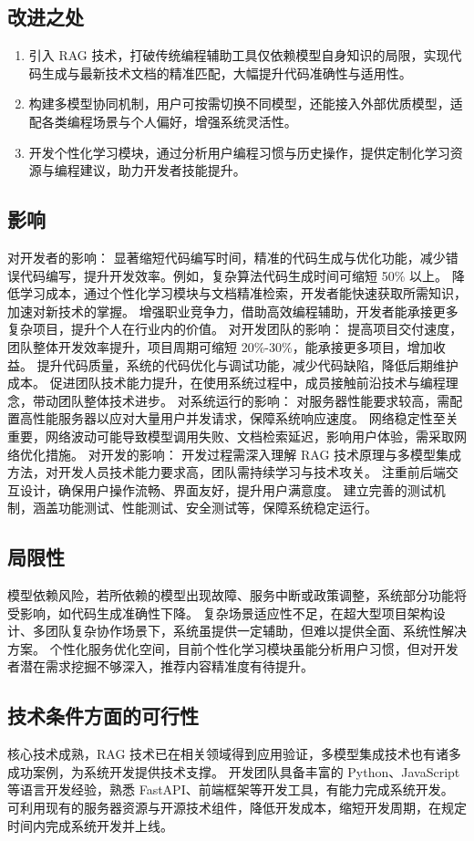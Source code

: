 \documentclass[
    report,     %
    oneside,    %
    UTF8,       %
    zihao=-4    %
]{config} %
\begin{document}
\subsection{改进之处}
\begin{enumerate}[label=(\arabic*)]
    \item 引入 RAG 技术，打破传统编程辅助工具仅依赖模型自身知识的局限，实现代码生成与最新技术文档的精准匹配，大幅提升代码准确性与适用性。
    \item 构建多模型协同机制，用户可按需切换不同模型，还能接入外部优质模型，适配各类编程场景与个人偏好，增强系统灵活性。
    \item 开发个性化学习模块，通过分析用户编程习惯与历史操作，提供定制化学习资源与编程建议，助力开发者技能提升。
\end{enumerate}
\subsection{影响}
对开发者的影响：
显著缩短代码编写时间，精准的代码生成与优化功能，减少错误代码编写，提升开发效率。例如，复杂算法代码生成时间可缩短 50\% 以上。
降低学习成本，通过个性化学习模块与文档精准检索，开发者能快速获取所需知识，加速对新技术的掌握。
增强职业竞争力，借助高效编程辅助，开发者能承接更多复杂项目，提升个人在行业内的价值。
对开发团队的影响：
提高项目交付速度，团队整体开发效率提升，项目周期可缩短 20\%-30\%，能承接更多项目，增加收益。
提升代码质量，系统的代码优化与调试功能，减少代码缺陷，降低后期维护成本。
促进团队技术能力提升，在使用系统过程中，成员接触前沿技术与编程理念，带动团队整体技术进步。
对系统运行的影响：
对服务器性能要求较高，需配置高性能服务器以应对大量用户并发请求，保障系统响应速度。
网络稳定性至关重要，网络波动可能导致模型调用失败、文档检索延迟，影响用户体验，需采取网络优化措施。
对开发的影响：
开发过程需深入理解 RAG 技术原理与多模型集成方法，对开发人员技术能力要求高，团队需持续学习与技术攻关。
注重前后端交互设计，确保用户操作流畅、界面友好，提升用户满意度。
建立完善的测试机制，涵盖功能测试、性能测试、安全测试等，保障系统稳定运行。
\subsection{局限性}
模型依赖风险，若所依赖的模型出现故障、服务中断或政策调整，系统部分功能将受影响，如代码生成准确性下降。
复杂场景适应性不足，在超大型项目架构设计、多团队复杂协作场景下，系统虽提供一定辅助，但难以提供全面、系统性解决方案。
个性化服务优化空间，目前个性化学习模块虽能分析用户习惯，但对开发者潜在需求挖掘不够深入，推荐内容精准度有待提升。
\subsection{技术条件方面的可行性}
核心技术成熟，RAG 技术已在相关领域得到应用验证，多模型集成技术也有诸多成功案例，为系统开发提供技术支撑。
开发团队具备丰富的 Python、JavaScript 等语言开发经验，熟悉 FastAPI、前端框架等开发工具，有能力完成系统开发。
可利用现有的服务器资源与开源技术组件，降低开发成本，缩短开发周期，在规定时间内完成系统开发并上线。
\end{document}
